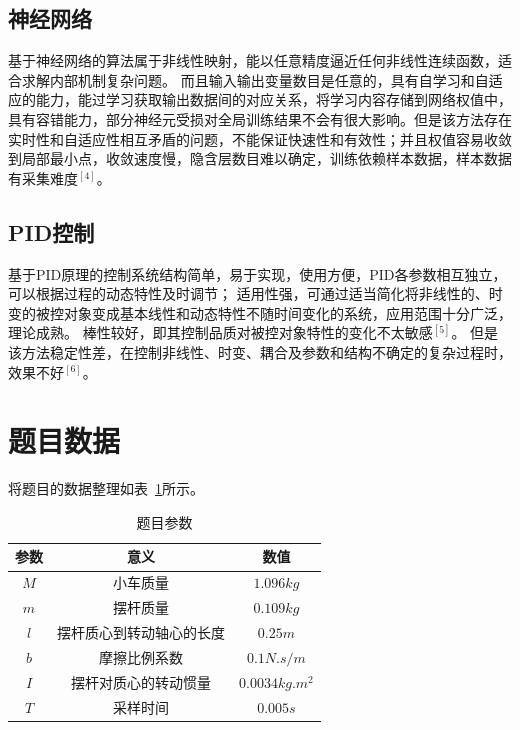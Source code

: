 \subsection{神经网络}
基于神经网络的算法属于非线性映射，能以任意精度逼近任何非线性连续函数，适合求解内部机制复杂问题。
而且输入输出变量数目是任意的，具有自学习和自适应的能力，能过学习获取输出数据间的对应关系，将学习内容存储到网络权值中，具有容错能力，部分神经元受损对全局训练结果不会有很大影响。但是该方法存在实时性和自适应性相互矛盾的问题，不能保证快速性和有效性；并且权值容易收敛到局部最小点，收敛速度慢，隐含层数目难以确定，训练依赖样本数据，样本数据有采集难度$^{[4]}$。

\subsection{PID控制}
基于PID原理的控制系统结构简单，易于实现，使用方便，PID各参数相互独立，可以根据过程的动态特性及时调节；
适用性强，可通过适当简化将非线性的、时变的被控对象变成基本线性和动态特性不随时间变化的系统，应用范围十分广泛，理论成熟。
棒性较好，即其控制品质对被控对象特性的变化不太敏感$^{[5]}$。
但是该方法稳定性差，在控制非线性、时变、耦合及参数和结构不确定的复杂过程时，效果不好$^{[6]}$。

\section{题目数据}

将题目的数据整理如表~\ref{para}所示。

\begin{table}[h]
\centering
\begin{tabular}{ccc}
\hline
参数 & 意义           & 数值                            \\ \hline
$M$  & 小车质量         & $1.096kg$                       \\ \hline
$m$ & 摆杆质量         & $0.109kg$                       \\ \hline
$l$  & 摆杆质心到转动轴心的长度 & $0.25m$                         \\ \hline
$b$  & 摩擦比例系数       & $0.1N.s/m$                      \\ \hline
$I$  & 摆杆对质心的转动惯量   & $0.0034kg.m^2$ \\ \hline
$T$  & 采样时间         & $0.005s$                        \\ \hline
\end{tabular}
\caption{题目参数}\label{para}
\end{table}

